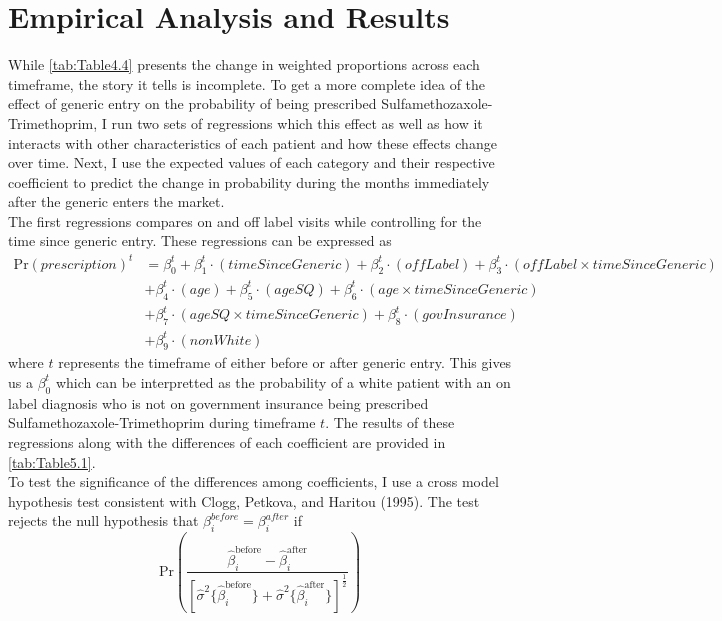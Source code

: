 \chapter{Empirical Analysis and Results}
While \autoref{tab:Table4.4} presents the change in weighted proportions across each timeframe, the story it tells is incomplete. To get a more complete idea of the effect of generic entry on the probability of being prescribed Sulfamethozaxole-Trimethoprim, I run two sets of regressions which this effect as well as how it interacts with other characteristics of each patient and how these effects change over time. Next, I use the expected values of each category and their respective coefficient to predict the change in probability during the months immediately after the generic enters the market. \\
\indent The first regressions compares on and off label visits while controlling for the time since generic entry. These regressions can be expressed as
\begin{equation}
\begin{split}
    \text{Pr}(prescription)^t & = \beta^t_0 + \beta^t_1\cdot(timeSinceGeneric) + \beta_2^t\cdot(offLabel) + \beta_3^t\cdot(offLabel\times timeSinceGeneric)\\
    & + \beta_4^t\cdot(age) + \beta_5^t\cdot(ageSQ)  + \beta_6^t\cdot(age\times timeSinceGeneric)\\
    & + \beta_7^t\cdot(ageSQ\times timeSinceGeneric)  + \beta_8^t\cdot(govInsurance)\\
    & + \beta_9^t\cdot(nonWhite)
\end{split}
\end{equation}
where $t$ represents the timeframe of either before or after generic entry. This gives us a $\beta_0^t$ which can be interpretted as the probability of a white patient with an on label diagnosis who is not on government insurance being prescribed Sulfamethozaxole-Trimethoprim during timeframe $t$. The results of these regressions along with the differences of each coefficient are provided in \autoref{tab:Table5.1}.\\
\indent To test the significance of the differences among coefficients, I use a cross model hypothesis test consistent with Clogg, Petkova, and Haritou (1995)\cite{clogg_statistical_1995}. The test rejects the null hypothesis that $\beta_i^{before} = \beta_i^{after}$ if 
\begin{equation}
\text{Pr}(\frac{\hat{\beta}^\text{before}_i - \hat{\beta}^\text{after}_i}{[\hat{\sigma}^2\{\hat{\beta}^\text{before}_i\} + \hat{\sigma}^2\{\hat{\beta}^\text{after}_i\}]^\frac{1}{2}})
\end{equation}
